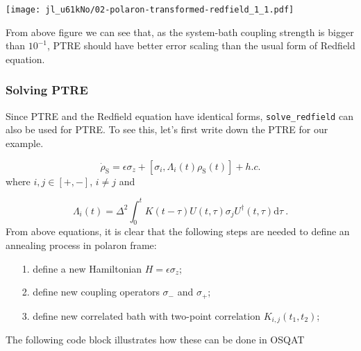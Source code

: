 \documentclass[12pt,a4paper]{article}
\begin{document}
\texttt{[image: jl\_u61kNo/02-polaron-transformed-redfield\_1\_1.pdf]}

From above figure we can see that, as the system-bath coupling strength is bigger than $10^{-1}$, PTRE should have better error scaling than the usual form of Redfield equation.

\subsubsection{Solving PTRE}
Since PTRE and the Redfield equation have identical forms, \texttt{solve\_redfield} can also be used for PTRE. To see this, let's first write down the PTRE for our example.

\[
\dot{\rho}_\mathrm{S} = \epsilon \ensuremath{\sigma}_z + [ \sigma_i, \Lambda_i(t) \rho_\mathrm{S}(t) ] + h.c.
\]
where $i,j \in [+, -]$, $i \neq j$ and

\[
\Lambda_i(t)=\Delta^2 \int_0^{t} K(t-\tau)U(t,\tau) \sigma_j U^\dagger(t,\tau) \mathrm{d}\tau \ .
\]
From above equations, it is clear that the following steps are needed to define an annealing process in polaron frame:

\begin{itemize}
\item[1. ] define a new Hamiltonian $H = \epsilon \ensuremath{\sigma}_z$;


\item[2. ] define new coupling operators $\sigma_-$ and $\sigma_+$;


\item[3. ] define new correlated bath with two-point correlation $K_{i,j}(t_1, t_2)$;

\end{itemize}
The following code block illustrates how these can be done in OSQAT
\end{document}
